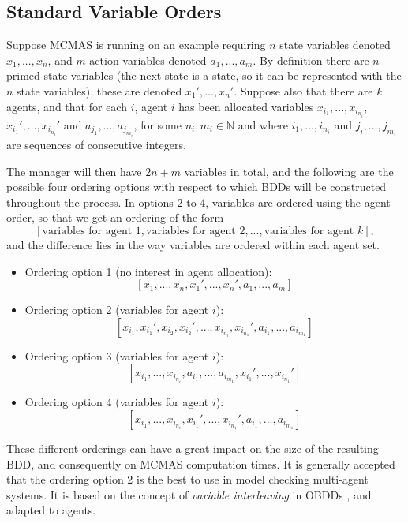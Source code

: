 \documentclass[11pt]{report}
\begin{document}
\subsection{Standard Variable Orders}
 \label{std_orderings}
Suppose MCMAS is running on an example requiring $n$ state variables denoted $x_1, ..., x_n$, and $m$ action variables denoted $a_1, ..., a_m$. By definition there are $n$ primed state variables (the next state is a state, so it can be represented with the $n$ state variables), these are denoted $x_1', ..., x_n'$. 
Suppose also that there are $k$ agents, and that for each $i$, agent $i$ has been allocated variables $x_{i_1}, ..., x_{i_{n_i}}$, $x_{i_1}', ..., x_{i_{n_i}}'$ and $a_{j_1}, ..., a_{j_{m_i}}$, for some $n_i, m_i \in \mathbb{N}$ and where $i_1, ..., i_{n_i}$ and $j_i, ..., j_{m_i}$ are sequences of consecutive integers.



The manager will then have $2n + m$ variables in total, and the following are the possible four ordering options with respect to which BDDs will be constructed throughout the process.
In options 2 to 4, variables are ordered using the agent order, so that we get an ordering of the form $$ [\mbox{variables for agent } 1, \mbox{variables for agent } 2, ...,  \mbox{variables for agent } k],$$ 
and the difference lies in the way variables are ordered within each agent set.
\begin{itemize}
\item Ordering option 1 (no interest in agent allocation):
$$[x_1, ..., x_n, x_1', ..., x_n', a_1, ..., a_m]$$
\item Ordering option 2 (variables for agent $i$):
$$
 [x_{i_1}, x_{i_1}', x_{i_2}, x_{i_2}',..., x_{i_{n_i}}, x_{i_{n_1}}', a_{i_1}, ..., a_{i_{m_1}}]
$$
\item Ordering option 3 (variables for agent $i$):
$$
 [x_{i_1}, ..., x_{i_{n_i}},a_{i_1}, ..., a_{i_{m_1}}, x_{i_1}', ..., x_{i_{n_1}}']
$$
\item Ordering option 4 (variables for agent $i$):
$$
 [x_{i_1}, ..., x_{i_{n_i}}, x_{i_1}', ..., x_{i_{n_1}}', a_{i_1}, ..., a_{i_{m_1}}]
$$
\end{itemize}

These different orderings can have a great impact on the size of the resulting BDD, and consequently on MCMAS computation times. It is generally accepted that the ordering option 2 is the best to use in model checking multi-agent systems. It is based on the concept of \textit{variable interleaving} in OBDDs \cite{interleaving}, and adapted to agents.
\end{document}
